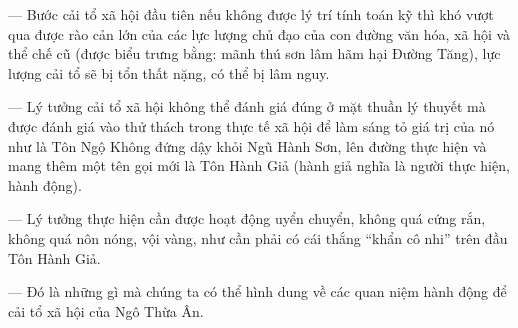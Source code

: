 --- Bước cải tổ xã hội đầu tiên nếu không được lý trí tính toán kỹ thì khó vượt qua được rào cản lớn của các lực lượng chủ đạo của con đường văn hóa, xã hội và thể chế cũ (được biểu trưng bằng: mãnh thú sơn lâm hãm hại Đường Tăng), lực lượng cải tổ sẽ bị tổn thất nặng, có thể bị lâm nguy.

--- Lý tưởng cải tổ xã hội không thể đánh giá đúng ở mặt thuần lý thuyết mà được đánh giá vào thử thách trong thực tế xã hội để làm sáng tỏ giá trị của nó như là Tôn Ngộ Không đứng dậy khỏi Ngũ Hành Sơn, lên đường thực hiện và mang thêm một tên gọi mới là Tôn Hành Giả (hành giả nghĩa là người thực hiện, hành động).

--- Lý tưởng thực hiện cần được hoạt động uyển chuyển, không quá cứng rắn, không quá nôn nóng, vội vàng, như cần phải có cái thắng ``khẩn cô nhi'' trên đầu Tôn Hành Giả.

--- Đó là những gì mà chúng ta có thể hình dung về các quan niệm hành động để cải tổ xã hội của Ngô Thừa Ân.
